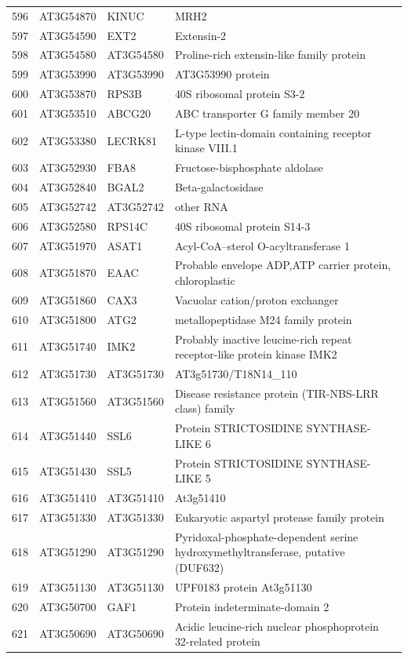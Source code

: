 \documentclass[11pt]{article}
\begin{document}
\begin{center}
\begin{tabular}{rlll}
596 & AT3G54870 & KINUC & MRH2\\
597 & AT3G54590 & EXT2 & Extensin-2\\
598 & AT3G54580 & AT3G54580 & Proline-rich extensin-like family protein\\
599 & AT3G53990 & AT3G53990 & AT3G53990 protein\\
600 & AT3G53870 & RPS3B & 40S ribosomal protein S3-2\\
601 & AT3G53510 & ABCG20 & ABC transporter G family member 20\\
602 & AT3G53380 & LECRK81 & L-type lectin-domain containing receptor kinase VIII.1\\
603 & AT3G52930 & FBA8 & Fructose-bisphosphate aldolase\\
604 & AT3G52840 & BGAL2 & Beta-galactosidase\\
605 & AT3G52742 & AT3G52742 & other RNA\\
606 & AT3G52580 & RPS14C & 40S ribosomal protein S14-3\\
607 & AT3G51970 & ASAT1 & Acyl-CoA--sterol O-acyltransferase 1\\
608 & AT3G51870 & EAAC & Probable envelope ADP,ATP carrier protein, chloroplastic\\
609 & AT3G51860 & CAX3 & Vacuolar cation/proton exchanger\\
610 & AT3G51800 & ATG2 & metallopeptidase M24 family protein\\
611 & AT3G51740 & IMK2 & Probably inactive leucine-rich repeat receptor-like protein kinase IMK2\\
612 & AT3G51730 & AT3G51730 & AT3g51730/T18N14\_110\\
613 & AT3G51560 & AT3G51560 & Disease resistance protein (TIR-NBS-LRR class) family\\
614 & AT3G51440 & SSL6 & Protein STRICTOSIDINE SYNTHASE-LIKE 6\\
615 & AT3G51430 & SSL5 & Protein STRICTOSIDINE SYNTHASE-LIKE 5\\
616 & AT3G51410 & AT3G51410 & At3g51410\\
617 & AT3G51330 & AT3G51330 & Eukaryotic aspartyl protease family protein\\
618 & AT3G51290 & AT3G51290 & Pyridoxal-phosphate-dependent serine hydroxymethyltransferase, putative (DUF632)\\
619 & AT3G51130 & AT3G51130 & UPF0183 protein At3g51130\\
620 & AT3G50700 & GAF1 & Protein indeterminate-domain 2\\
621 & AT3G50690 & AT3G50690 & Acidic leucine-rich nuclear phosphoprotein 32-related protein\\

\end{tabular}
\end{center}
\end{document}
